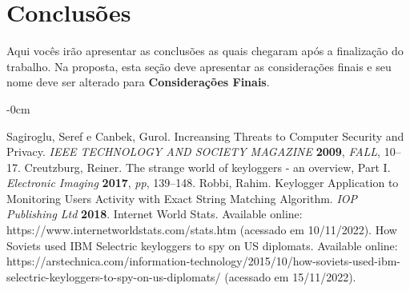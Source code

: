 \documentclass[applsci,article,submit,pdftex,moreauthors]{Definitions/mdpi}
\begin{document}
\section{Conclusões}

Aqui vocês irão apresentar as conclusões as quais chegaram após a finalização do trabalho. Na proposta, esta seção deve apresentar as considerações finais e seu nome deve ser alterado para \textbf{Considerações Finais}.

\vspace{6pt} 


\begin{adjustwidth}{-\extralength}{0cm}



%

\begin{thebibliography}{999}
Sagiroglu, Seref e Canbek, Gurol. Increansing Threats to Computer Security and Privacy. {\em IEEE TECHNOLOGY AND SOCIETY MAGAZINE} {\bf 2009}, {\em FALL}, 10--17.
 Creutzburg, Reiner. The strange world of keyloggers - an overview, Part I. {\em Electronic Imaging} {\bf 2017}, {\em pp}, 139--148.
 Robbi, Rahim. Keylogger Application to Monitoring Users Activity with Exact String Matching Algorithm. {\em  IOP Publishing Ltd} {\bf 2018}.
Internet World Stats. Available online: https://www.internetworldstats.com/stats.htm (acessado em 10/11/2022).
How Soviets used IBM Selectric keyloggers to spy on US diplomats. Available online: https://arstechnica.com/information-technology/2015/10/how-soviets-used-ibm-selectric-keyloggers-to-spy-on-us-diplomats/ (acessado em 15/11/2022).
\end{thebibliography}
\end{adjustwidth}
\end{document}
